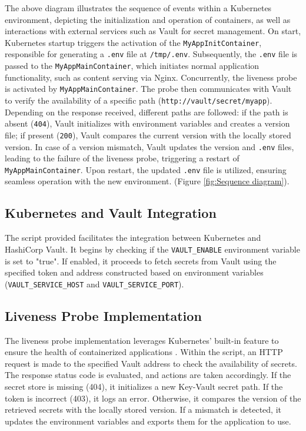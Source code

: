 The above diagram illustrates the sequence of events within a Kubernetes environment, depicting the initialization and operation of containers, as well as interactions with external services such as Vault for secret management. On start, Kubernetes startup triggers the activation of the \texttt{MyAppInitContainer}, responsible for generating a \texttt{.env} file at \texttt{/tmp/.env}. Subsequently, the \texttt{.env} file is passed to the \texttt{MyAppMainContainer}, which initiates normal application functionality, such as content serving via Nginx. Concurrently, the liveness probe is activated by \texttt{MyAppMainContainer}. The probe then communicates with Vault to verify the availability of a specific path (\texttt{http://vault/secret/myapp}). Depending on the response received, different paths are followed: if the path is absent (\texttt{404}), Vault initializes with environment variables and creates a version file; if present (\texttt{200}), Vault compares the current version with the locally stored version. In case of a version mismatch, Vault updates the version and \texttt{.env} files, leading to the failure of the liveness probe, triggering a restart of \texttt{MyAppMainContainer}. Upon restart, the updated \texttt{.env} file is utilized, ensuring seamless operation with the new environment. (Figure \ref{fig:Sequence diagram}).

\subsection{Kubernetes and Vault Integration}

The script provided facilitates the integration between Kubernetes and HashiCorp Vault. It begins by checking if the \texttt{VAULT\_ENABLE} environment variable is set to "true". If enabled, it proceeds to fetch secrets from Vault using the specified token and address constructed based on environment variables (\texttt{VAULT\_SERVICE\_HOST} and \texttt{VAULT\_SERVICE\_PORT}).

\subsection{Liveness Probe Implementation}

The liveness probe implementation leverages Kubernetes' built-in feature to ensure the health of containerized applications \cite{kubernetes-probes}. Within the script, an HTTP request is made to the specified Vault address to check the availability of secrets. The response status code is evaluated, and actions are taken accordingly. If the secret store is missing (404), it initializes a new Key-Vault secret path. If the token is incorrect (403), it logs an error. Otherwise, it compares the version of the retrieved secrets with the locally stored version. If a mismatch is detected, it updates the environment variables and exports them for the application to use.

